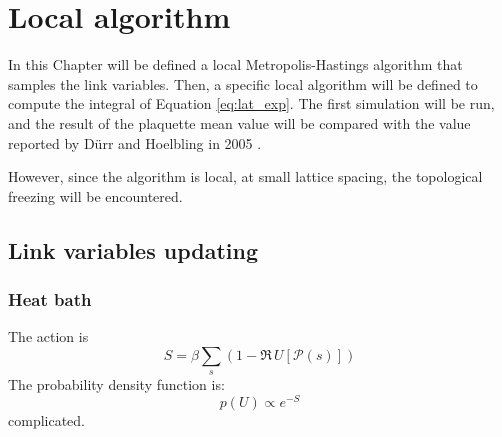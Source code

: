 \chapter{Local algorithm}\label{ch:local}

In this Chapter will be defined a local Metropolis-Hastings algorithm that samples the link variables.
Then, a specific local algorithm will be defined to compute the integral of Equation \eqref{eq:lat_exp}.
The first simulation will be run,
and the result of the plaquette mean value will be compared with the value reported by D\"urr and Hoelbling in 2005 \cite{durr-hoelbling:2005}.

However, since the algorithm is local, at small lattice spacing, the topological freezing will be encountered.

\section{Link variables updating}
\subsection*{Heat bath}
The action is 
\[
    S = \beta\sum_s\left(1-\Re\,U[\mathcal P(s)]\right)
\]
The probability density function is:
\[
    p(U) \propto e^{-S}
\]
complicated.


